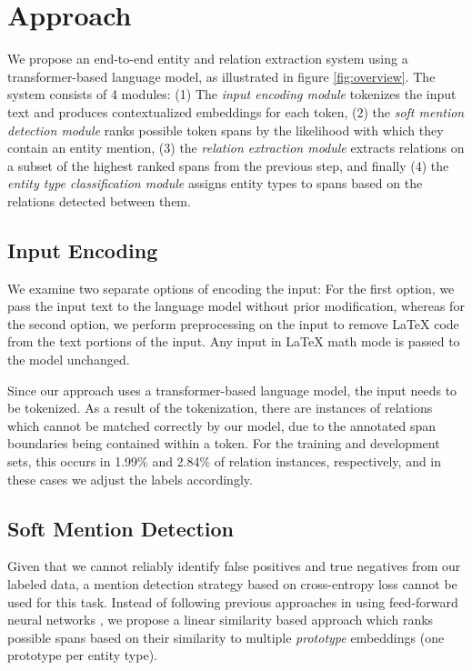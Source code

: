 \documentclass[11pt]{article}
\begin{document}
\section{Approach}








We propose an end-to-end entity and relation extraction system using a transformer-based language model, as illustrated in figure \ref{fig:overview}. 
The system consists of 4 modules: (1) The \textit{input encoding module} tokenizes the input text and produces contextualized embeddings for each token, (2) the \textit{soft mention detection module} ranks possible token spans by the likelihood with which they contain an entity mention, (3) the \textit{relation extraction module} extracts relations on a subset of the highest ranked spans from the previous step, and finally (4) the \textit{entity type classification module} assigns entity types to spans based on the relations detected between them.

\subsection{Input Encoding}
\label{sec:preprocessing}
We examine two separate options of encoding the input: 
For the first option, we pass the input text to the language
model without prior modification, whereas for the second option, we
perform preprocessing on the input to remove LaTeX code from the text portions of the input. Any
input in LaTeX math mode is passed to the model
unchanged.

Since our approach uses a transformer-based language model, the input needs to be tokenized. As a result of the tokenization, there are instances of relations which cannot be matched correctly by our model, due to the annotated span boundaries being contained within a token. 
For the training and development sets, this occurs in 1.99\% and 2.84\% of relation instances, respectively, and in these cases we adjust the labels accordingly.

\subsection{Soft Mention Detection}
\label{sec:mention_localization}
Given that we cannot reliably identify false positives and true negatives from our labeled data, a mention detection strategy based on cross-entropy loss cannot be used for this task.
Instead of following previous approaches in using feed-forward neural networks \cite{luan_multi-task_2018, wadden_entity_2019}, we propose a linear similarity based approach which ranks possible spans based on their similarity to multiple \textit{prototype} embeddings (one prototype per entity type).
\end{document}
